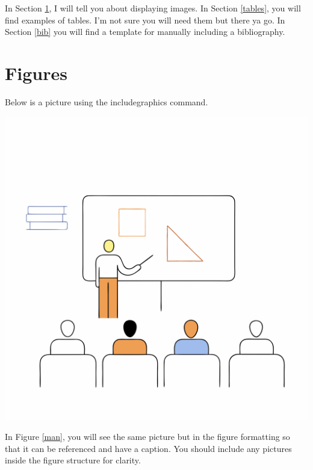 \documentclass{article}
\begin{document}
In Section \ref{figures}, I will tell you about displaying images. In Section \ref{tables}, you will find examples of tables. I'm not sure you will need them but there ya go. In Section \ref{bib} you will find a template for manually including a bibliography. 

\section{Figures}\label{figures}

Below is a picture using the includegraphics command.

\includegraphics[scale=0.03]{momo.png}

In Figure \ref{man}, you will see the same picture but in the figure formatting so that it can be referenced and have a caption. You should include any pictures inside the figure structure for clarity.
\end{document}
